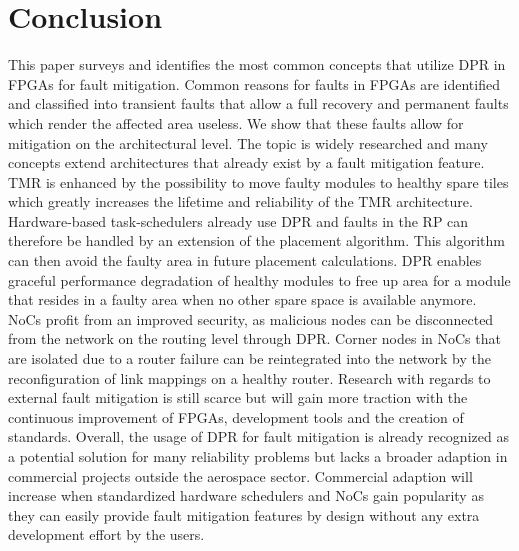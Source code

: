 \section{Conclusion}\label{Conclusion}
This paper surveys and identifies the most common concepts that utilize \gls{DPR} in \glspl{FPGA} for fault mitigation.
Common reasons for faults in \glspl{FPGA} are identified and classified into transient faults that allow a full recovery and permanent faults which render the affected area useless. 
We show that these faults allow for mitigation on the architectural level.
The topic is widely researched and many concepts extend architectures that already exist by a fault mitigation feature.
\gls{TMR} is enhanced by the possibility to move faulty modules to healthy spare tiles which greatly increases the lifetime and reliability of the \gls{TMR} architecture.  
Hardware-based task-schedulers already use \gls{DPR} and faults in the \gls{RP} can therefore be handled by an extension of the placement algorithm.
This algorithm can then avoid the faulty area in future placement calculations.
\gls{DPR} enables graceful performance degradation of healthy modules to free up area for a module that resides in a faulty area when no other spare space is available anymore. 
\glspl{NoC} profit from an improved security, as malicious nodes can be disconnected from the network on the routing level through \gls{DPR}.
Corner nodes in \glspl{NoC} that are isolated due to a router failure can be reintegrated into the network by the reconfiguration of link mappings on a healthy router. 
Research with regards to external fault mitigation is still scarce but will gain more traction with the continuous improvement of \glspl{FPGA}, development tools and the creation of standards.
Overall, the usage of \gls{DPR} for fault mitigation is already recognized as a potential solution for many reliability problems but lacks a broader adaption in commercial projects outside the aerospace sector.
Commercial adaption will increase when standardized hardware schedulers and \glspl{NoC} gain popularity as they can easily provide fault mitigation features by design without any extra development effort by the users.